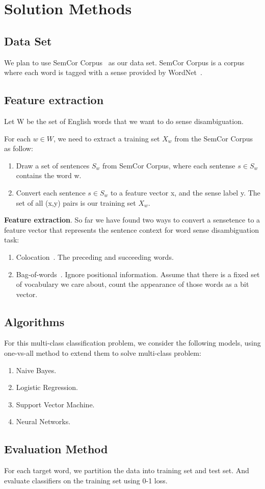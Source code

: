\section{Solution Methods}

\subsection{Data Set}

We plan to use SemCor Corpus~\cite{semcor} as our data set. SemCor Corpus is a
corpus where each word is tagged with a sense provided by WordNet~\cite{wordnet}.

\subsection{Feature extraction}

Let W be the set of English words that we want to do sense disambiguation. 

For each $w \in W$, we need to extract a training set $X_w$ from the SemCor
Corpus as follow: 
\begin{enumerate}
  \item Draw a set of sentences $S_w$ from SemCor Corpus, where each sentense
$s \in S_w$ contains the word w. 
  \item Convert each sentence $s \in S_w$ to a feature vector x, and the sense
    label y. The set of all (x,y) pairs is our training set $X_w$.
\end{enumerate}

\textbf{Feature extraction}. So far we have found two ways to convert a
sensetence to a feature vector that represents the sentence context for word
sense disambiguation task:
\begin{enumerate}
  \item Colocation~\cite{colocation}. The preceding and succeeding words.
  \item Bag-of-words~\cite{bagofwords}. Ignore positional information. Assume
    that there is a fixed set of vocabulary we care about, count the appearance
    of those words as a bit vector.
\end{enumerate}

\subsection{Algorithms}

For this multi-class classification problem, we consider the following models,
using one-vs-all method to extend them to solve multi-class problem:
\begin{enumerate}
  \item Naive Bayes.
  \item Logistic Regression.
  \item Support Vector Machine.
  \item Neural Networks.
\end{enumerate}

\subsection{Evaluation Method}

For each target word, we partition the data into training set and test set. And
evaluate classifiers on the training set using 0-1 loss.
